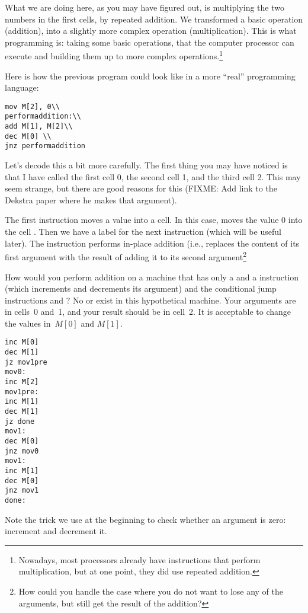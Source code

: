 What we are doing here, as you may have figured out, is multiplying the two
numbers in the first cells, by repeated addition. We transformed a basic
operation (addition), into a slightly more complex operation (multiplication).
This is what programming is: taking some basic operations, that the computer
processor can execute and building them up to more complex
operations.\footnote{Nowadays, most processors already have instructions that
perform multiplication, but at one point, they did use repeated addition.}

Here is how the previous program could look like in a more ``real'' programming
language:

\begin{verbatim}
mov M[2], 0\\
performaddition:\\
add M[1], M[2]\\
dec M[0] \\
jnz performaddition
\end{verbatim}

Let's decode this a bit more carefully. The first thing you may have noticed is
that I have called the first cell 0, the second cell 1, and the third cell 2.
This may seem strange, but there are good reasons for this (FIXME: Add link to
the Dekstra paper where he makes that argument).

The first instruction  moves a value into a cell. In this
case, moves the value 0 into the cell . Then we have a label
for the next instruction (which will be useful later). The 
instruction performs in-place addition (i.e., replaces the content of its first
argument with the result of adding it to its second argument\footnote{How could
you handle the case where you do not want to lose any of the arguments, but
still get the result of the addition? }

\begin{exercise}
How would you perform addition on a machine that has only a 
and a  instruction (which increments and decrements its
argument) and the conditional jump instructions  and
? No  or  exist in this
hypothetical machine. Your arguments are in cells~0 and~1, and your result
should be in cell~2. It is acceptable to change the values in~$M[0]$ and
$M[1]$.
\begin{solution}
\begin{verbatim}
inc M[0]
dec M[1]
jz mov1pre
mov0:
inc M[2]
mov1pre:
inc M[1]
dec M[1]
jz done
mov1:
dec M[0]
jnz mov0
mov1:
inc M[1]
dec M[0]
jnz mov1
done:
\end{verbatim}

Note the trick we use at the beginning to check whether an argument is zero:
increment and decrement it.
\end{solution}
\end{exercise}

